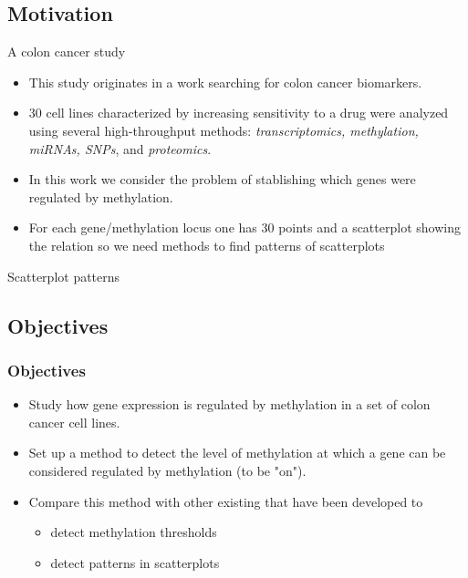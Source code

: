 \documentclass[handout]{beamer}
\begin{document}
\subsection{Motivation}
\begin{frame}{A colon cancer study}
  \begin{itemize}
  \item This study originates in a work searching for colon cancer biomarkers.
  \item 30 cell lines characterized by increasing sensitivity to a drug were analyzed using several high-throughput methods:\emph{ transcriptomics, methylation, miRNAs, SNPs}, and \emph{proteomics}.
\item In this work we consider the problem of stablishing which genes were regulated by methylation.
\item For each gene/methylation locus one has 30 points and a scatterplot showing the relation so we need methods to find patterns of scatterplots
  \end{itemize}
\end{frame}

\begin{frame}{Scatterplot patterns}
\end{frame}



\subsection{Objectives}

\begin{frame}[fragile]\frametitle{Objectives}
\label{sec-1.10}
\begin{itemize}
\item Study how gene expression is regulated by methylation in a set of colon cancer cell lines.\\
\label{sec-1.10.1}
\item Set up a method to detect the level of methylation at which a gene can be considered regulated by methylation (to be "on").\\
\label{sec-1.10.2}
\item Compare this method with other existing that have been developed to\\
\label{sec-1.10.3}
\begin{itemize}
\item detect methylation thresholds\\
\label{sec-1.10.3.1}
\item detect patterns in scatterplots\\
\label{sec-1.10.3.2}
\end{itemize} %
\end{itemize} %
\end{frame}
\end{document}
